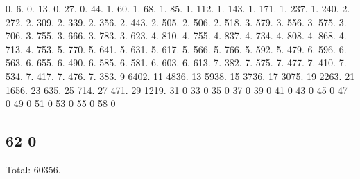 0. 6. 0. 13. 0. 27. 0. 44. 1. 60. 1. 68. 1. 85. 1. 112. 1. 143. 1. 171. 1. 237. 1. 240. 2. 272. 2. 309. 2. 339. 2. 356. 2. 443. 2. 505. 2. 506. 2. 518. 3. 579. 3. 556. 3. 575. 3. 706. 3. 755. 3. 666. 3. 783. 3. 623. 4. 810. 4. 755. 4. 837. 4. 734. 4. 808. 4. 868. 4. 713. 4. 753. 5. 770. 5. 641. 5. 631. 5. 617. 5. 566. 5. 766. 5. 592. 5. 479. 6. 596. 6. 563. 6. 655. 6. 490. 6. 585. 6. 581. 6. 603. 6. 613. 7. 382. 7. 575. 7. 477. 7. 410. 7. 534. 7. 417. 7. 476. 7. 383. 9 6402. 11 4836. 13 5938. 15 3736. 17 3075. 19 2263. 21 1656. 23 635. 25 714. 27 471. 29 1219. 31 0 33 0 35 0 37 0 39 0 41 0 43 0 45 0 47 0 49 0 51 0 53 0 55 0 58 0 \subsection*{62 0 }

Total\+: 60356. 